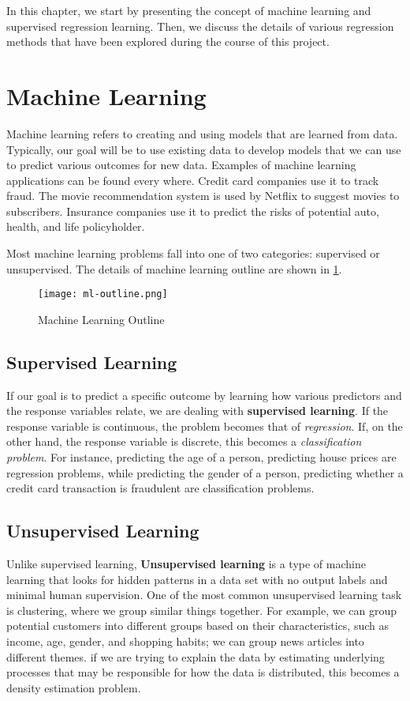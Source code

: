 
In this chapter, we start by presenting the concept of machine learning and
supervised regression learning. Then, we discuss the details of various
regression methods that have been explored during the course of this project.

\section{Machine Learning}

Machine learning refers to creating and using models that are learned from data.
Typically, our goal will be to use existing data to develop models that we can
use to predict various outcomes for new data. Examples of machine learning
applications can be found every where. Credit card companies use it to track
fraud.  The movie recommendation system is used by Netflix to suggest movies to
subscribers. Insurance companies use it to predict the risks of potential auto,
health, and life policyholder.

Most machine learning problems fall into one of two categories: supervised or
unsupervised. The details of machine learning outline are shown in
\ref{fig:ml-outline}.

\begin{figure}[H]\centering
    \texttt{[image: ml-outline.png]}
    \caption{Machine Learning Outline}
    \label{fig:ml-outline}
\end{figure}

\subsection{Supervised Learning}

If our goal is to predict a specific outcome by learning how various predictors
and the response variables relate, we are dealing with \textbf{supervised
learning}. If the response variable is continuous, the problem becomes that of
\textit{regression}. If, on the other hand, the response variable is discrete,
this becomes a \textit{classification problem}. For instance, predicting the age
of a person, predicting house prices are regression problems, while predicting
the gender of a person, predicting whether a credit card transaction is
fraudulent are classification problems.

\subsection{Unsupervised Learning}
Unlike supervised learning, \textbf{Unsupervised learning} is a type of machine
learning that looks for hidden patterns in a data set with no output labels and
minimal human supervision. One of the most common unsupervised learning task is
clustering, where we group similar things together. For example, we can group
potential customers into different groups based on their characteristics, such
as income, age, gender, and shopping habits; we can group news articles into
different themes. if we are trying to explain the data by estimating underlying
processes that may be responsible for how the data is distributed, this becomes
a density estimation problem.

